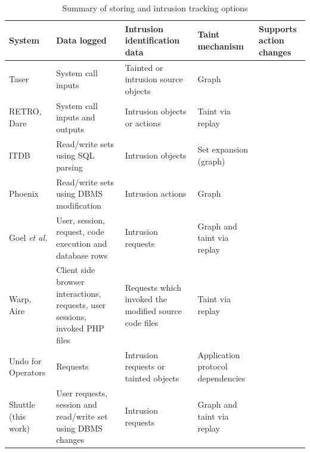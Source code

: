 \begin{center}
\begin{table}[ht]
\begin{tabular}{|m{2.5cm}|m{3.5cm}|m{3.5cm}|m{2.3cm}|C{1.5cm}|}
\hline
\textbf{System} & \textbf{Data logged}		& \textbf{Intrusion \newline identification data} & \textbf{Taint \newline mechanism} & \textbf{Supports action changes} \\ \hline
\cite{taser}Taser			  		& System call inputs 			& Tainted or intrusion source objects 	&Graph						& \xmark		\\ \hline
\cite{retro} \cite{dare} RETRO, Dare	& System call inputs and outputs	& Intrusion objects or actions   &Taint \newline via replay				& \xmark		\\ \hline
\cite{itdb} ITDB						& Read/write sets using \ac{SQL} parsing & Intrusion objects &Set expansion (graph)		& \xmark \\ \hline
\cite{phoenix} Phoenix					& Read/write sets using DBMS modification & Intrusion actions & Graph 				& \xmark		\\ \hline
\cite{goel} Goel \textit{et al.}	& User, session, request, code execution and database rows 		&  Intrusion requests &  Graph and taint via replay & \xmark \\ \hline
\cite{warp} \cite{aire} Warp, Aire		& Client side browser interactions, requests, user sessions, invoked PHP files &Requests which invoked the modified source code files & Taint via replay & \cmark	\\ \hline
\cite{undoForOperators} Undo for \newline Operators	&Requests		&Intrusion requests or tainted objects       &Application protocol \newline dependencies   &	\cmark		\\ \hline
Shuttle	\newline (this work)							& User requests, session and read/write set \newline using DBMS changes & Intrusion requests  & Graph and taint via replay & \cmark \\ \hline

\end{tabular}
\caption{Summary of storing and intrusion tracking options}
\label{tab:storingTracking}
\end{table}
\end{center}


